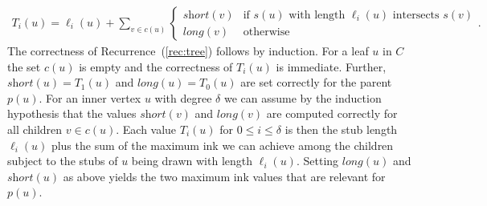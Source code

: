 \documentclass[a4paper,english,numberwithinsect]{eurocg18}
\newcommand{\maxsped}{\ensuremath{\textsc{MaxSPED}}\xspace}
\newcommand{\sollong}{\ensuremath{\textit{long}}\xspace}
\newcommand{\solshort}{\ensuremath{\textit{short}}\xspace}
\begin{document}
\begin{align}
	\label{rec:tree}
	T_i(u) = \ell_i(u) + \sum_{v \in c(u)}
	\begin{cases}
		\solshort(v) & \text{if } s(u) \text{ with length } \ell_i(u) \text{ intersects } s(v) \\
		\sollong(v) & \text{otherwise}
	\end{cases}.
\end{align}
The correctness of Recurrence~(\ref{rec:tree}) follows by induction. 
For a leaf $u$ in $C$ the set $c(u)$ is empty and the correctness of $T_i(u)$ is immediate.
Further, $\solshort(u) = T_1(u)$ and $\sollong(u) = T_0(u)$ are set correctly for the parent $p(u)$.
For an inner vertex $ u $ with degree $\delta$ we can assume by the induction hypothesis that the values $ \solshort(v) $ and $ \sollong(v) $ are computed correctly for all children $ v \in c(u) $. 
Each value $ T_i(u) $ for $ 0 \leq i \leq \delta $ is then the stub length $ \ell_i(u) $ plus the sum of the maximum ink we can achieve among the children subject to the stubs of $u$ being drawn with length $\ell_i(u)$. 
Setting $ \sollong(u) $ and $ \solshort(u) $ as above yields the two maximum ink values that are relevant for $ p(u) $.
\end{document}
